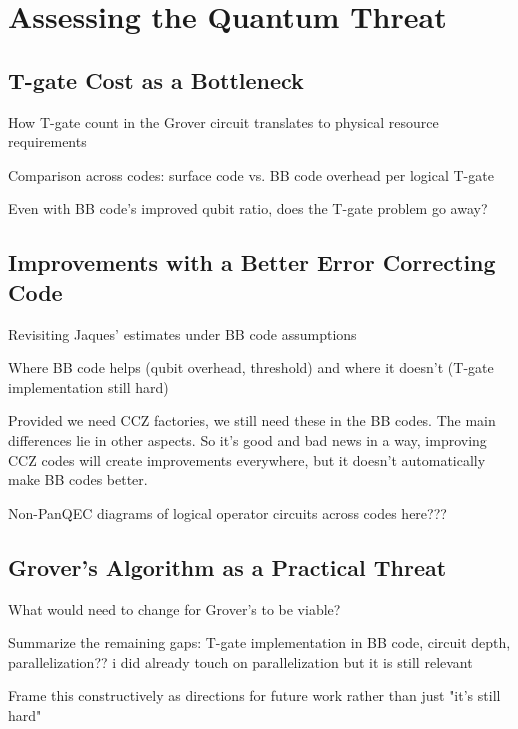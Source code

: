 \chapter{Assessing the Quantum Threat}

\section{T-gate Cost as a Bottleneck}
How T-gate count in the Grover circuit translates to physical resource requirements

Comparison across codes: surface code vs. BB code overhead per logical T-gate

Even with BB code's improved qubit ratio, does the T-gate problem go away?

\section{Improvements with a Better Error Correcting Code}
Revisiting Jaques' estimates under BB code assumptions

Where BB code helps (qubit overhead, threshold) and where it doesn't (T-gate implementation still hard)

Provided we need CCZ factories, we still need these in the BB codes. The main differences lie in other aspects. So it's good and bad news in a way, improving CCZ codes will create improvements everywhere, but it doesn't automatically make BB codes better.

Non-PanQEC diagrams of logical operator circuits across codes here??? 

\section{Grover's Algorithm as a Practical Threat}
What would need to change for Grover's to be viable? 

Summarize the remaining gaps: T-gate implementation in BB code, circuit depth, parallelization?? i did already touch on parallelization but it is still relevant

Frame this constructively as directions for future work rather than just "it's still hard"